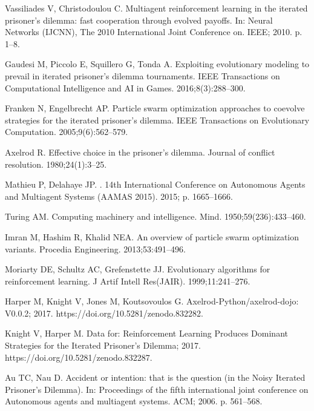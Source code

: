 \documentclass[10pt,letterpaper]{article}
\begin{document}
\begin{thebibliography}{10}
Vassiliades V, Christodoulou C.
\newblock Multiagent reinforcement learning in the iterated prisoner's dilemma:
  fast cooperation through evolved payoffs.
\newblock In: Neural Networks (IJCNN), The 2010 International Joint Conference
  on. IEEE; 2010. p. 1--8.

Gaudesi M, Piccolo E, Squillero G, Tonda A.
\newblock Exploiting evolutionary modeling to prevail in iterated prisoner’s
  dilemma tournaments.
\newblock IEEE Transactions on Computational Intelligence and AI in Games.
  2016;8(3):288--300.

Franken N, Engelbrecht AP.
\newblock Particle swarm optimization approaches to coevolve strategies for the
  iterated prisoner's dilemma.
\newblock IEEE Transactions on Evolutionary Computation. 2005;9(6):562--579.

Axelrod R.
\newblock Effective choice in the prisoner's dilemma.
\newblock Journal of conflict resolution. 1980;24(1):3--25.

Mathieu P, Delahaye JP.
.
\newblock 14th International Conference on Autonomous Agents and Multiagent
  Systems (AAMAS 2015). 2015; p. 1665--1666.

Turing AM.
\newblock Computing machinery and intelligence.
\newblock Mind. 1950;59(236):433--460.

Imran M, Hashim R, Khalid NEA.
\newblock An overview of particle swarm optimization variants.
\newblock Procedia Engineering. 2013;53:491--496.

Moriarty DE, Schultz AC, Grefenstette JJ.
\newblock Evolutionary algorithms for reinforcement learning.
\newblock J Artif Intell Res(JAIR). 1999;11:241--276.

Harper M, Knight V, Jones M, Koutsovoulos G. Axelrod-Python/axelrod-dojo:
  V0.0.2; 2017.
\newblock https://doi.org/10.5281/zenodo.832282.

Knight V, Harper M. {Data for: Reinforcement Learning Produces Dominant
  Strategies for the Iterated Prisoner's Dilemma}; 2017.
\newblock https://doi.org/10.5281/zenodo.832287.

Au TC, Nau D.
\newblock Accident or intention: that is the question (in the Noisy Iterated
  Prisoner's Dilemma).
\newblock In: Proceedings of the fifth international joint conference on
  Autonomous agents and multiagent systems. ACM; 2006. p. 561--568.


\end{thebibliography}
\end{document}

